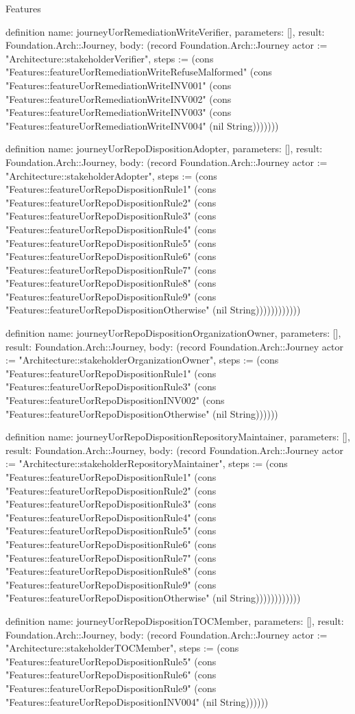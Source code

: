 \begin{lexlean}{Features}
\begin{semanticmodule}
definition{
  name: journeyUorRemediationWriteVerifier,
  parameters: [],
  result: Foundation.Arch::Journey,
  body: (record Foundation.Arch::Journey {actor := "Architecture::stakeholderVerifier", steps := (cons "Features::featureUorRemediationWriteRefuseMalformed" (cons "Features::featureUorRemediationWriteINV001" (cons "Features::featureUorRemediationWriteINV002" (cons "Features::featureUorRemediationWriteINV003" (cons "Features::featureUorRemediationWriteINV004" (nil String))))))})
}

definition{
  name: journeyUorRepoDispositionAdopter,
  parameters: [],
  result: Foundation.Arch::Journey,
  body: (record Foundation.Arch::Journey {actor := "Architecture::stakeholderAdopter", steps := (cons "Features::featureUorRepoDispositionRule1" (cons "Features::featureUorRepoDispositionRule2" (cons "Features::featureUorRepoDispositionRule3" (cons "Features::featureUorRepoDispositionRule4" (cons "Features::featureUorRepoDispositionRule5" (cons "Features::featureUorRepoDispositionRule6" (cons "Features::featureUorRepoDispositionRule7" (cons "Features::featureUorRepoDispositionRule8" (cons "Features::featureUorRepoDispositionRule9" (cons "Features::featureUorRepoDispositionOtherwise" (nil String)))))))))))})
}

definition{
  name: journeyUorRepoDispositionOrganizationOwner,
  parameters: [],
  result: Foundation.Arch::Journey,
  body: (record Foundation.Arch::Journey {actor := "Architecture::stakeholderOrganizationOwner", steps := (cons "Features::featureUorRepoDispositionRule1" (cons "Features::featureUorRepoDispositionRule3" (cons "Features::featureUorRepoDispositionINV002" (cons "Features::featureUorRepoDispositionOtherwise" (nil String)))))})
}

definition{
  name: journeyUorRepoDispositionRepositoryMaintainer,
  parameters: [],
  result: Foundation.Arch::Journey,
  body: (record Foundation.Arch::Journey {actor := "Architecture::stakeholderRepositoryMaintainer", steps := (cons "Features::featureUorRepoDispositionRule1" (cons "Features::featureUorRepoDispositionRule2" (cons "Features::featureUorRepoDispositionRule3" (cons "Features::featureUorRepoDispositionRule4" (cons "Features::featureUorRepoDispositionRule5" (cons "Features::featureUorRepoDispositionRule6" (cons "Features::featureUorRepoDispositionRule7" (cons "Features::featureUorRepoDispositionRule8" (cons "Features::featureUorRepoDispositionRule9" (cons "Features::featureUorRepoDispositionOtherwise" (nil String)))))))))))})
}

definition{
  name: journeyUorRepoDispositionTOCMember,
  parameters: [],
  result: Foundation.Arch::Journey,
  body: (record Foundation.Arch::Journey {actor := "Architecture::stakeholderTOCMember", steps := (cons "Features::featureUorRepoDispositionRule5" (cons "Features::featureUorRepoDispositionRule6" (cons "Features::featureUorRepoDispositionRule9" (cons "Features::featureUorRepoDispositionINV004" (nil String)))))})
}


\end{semanticmodule}
\end{lexlean}
